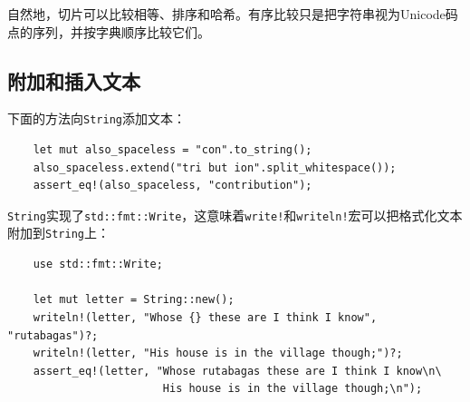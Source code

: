 

自然地，切片可以比较相等、排序和哈希。有序比较只是把字符串视为Unicode码点的序列，并按字典顺序比较它们。

\subsection{附加和插入文本}\label{AppendText}

下面的方法向\texttt{String}添加文本：



\begin{verbatim}
    let mut also_spaceless = "con".to_string();
    also_spaceless.extend("tri but ion".split_whitespace());
    assert_eq!(also_spaceless, "contribution");
\end{verbatim}



\texttt{String}实现了\texttt{std::fmt::Write}，这意味着\texttt{write!}和\texttt{writeln!}宏可以把格式化文本附加到\texttt{String}上：
\begin{verbatim}
    use std::fmt::Write;

    let mut letter = String::new();
    writeln!(letter, "Whose {} these are I think I know", "rutabagas")?;
    writeln!(letter, "His house is in the village though;")?;
    assert_eq!(letter, "Whose rutabagas these are I think I know\n\
                        His house is in the village though;\n");
\end{verbatim}

